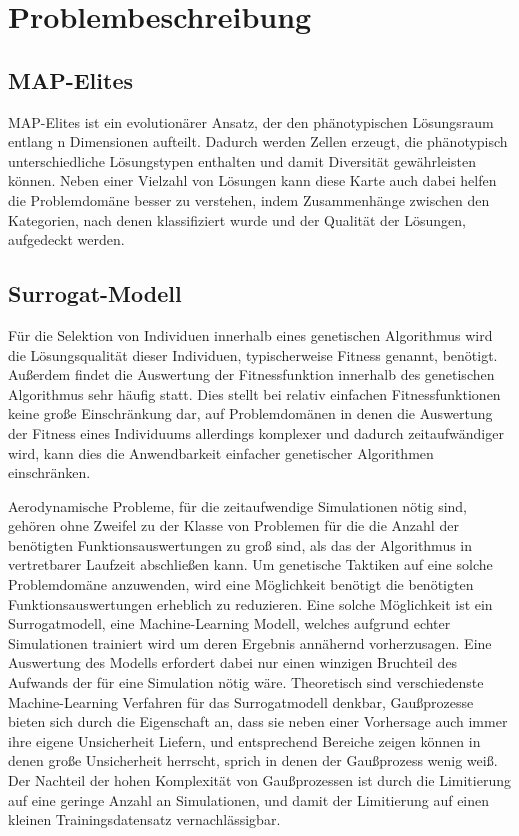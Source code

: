 \documentclass[12pt]{article}
\begin{document}
\section{Problembeschreibung}

\subsection{MAP-Elites}

MAP-Elites ist ein evolutionärer Ansatz, der den phänotypischen Lösungsraum entlang n Dimensionen aufteilt.
Dadurch werden Zellen erzeugt, die phänotypisch unterschiedliche Lösungstypen enthalten und damit Diversität gewährleisten können.
Neben einer Vielzahl von Lösungen kann diese Karte auch dabei helfen die Problemdomäne besser zu verstehen, indem Zusammenhänge zwischen den Kategorien, nach denen klassifiziert wurde und der Qualität der Lösungen, aufgedeckt werden.

\subsection{Surrogat-Modell}

Für die Selektion von Individuen innerhalb eines genetischen Algorithmus wird die Lösungsqualität dieser Individuen, typischerweise Fitness genannt, benötigt.
Außerdem findet die Auswertung der Fitnessfunktion innerhalb des genetischen Algorithmus sehr häufig statt.
Dies stellt bei relativ einfachen Fitnessfunktionen keine große Einschränkung dar, auf Problemdomänen in denen die Auswertung der Fitness eines Individuums allerdings komplexer und dadurch zeitaufwändiger wird, kann dies die Anwendbarkeit einfacher genetischer Algorithmen einschränken.

Aerodynamische Probleme, für die zeitaufwendige Simulationen nötig sind, gehören ohne Zweifel zu der Klasse von Problemen für die die Anzahl der benötigten Funktionsauswertungen zu groß sind, als das der Algorithmus in vertretbarer Laufzeit abschließen kann.
Um genetische Taktiken auf eine solche Problemdomäne anzuwenden, wird eine Möglichkeit benötigt die benötigten Funktionsauswertungen erheblich zu reduzieren.
Eine solche Möglichkeit ist ein Surrogatmodell, eine Machine-Learning Modell, welches aufgrund echter Simulationen trainiert wird um deren Ergebnis annähernd vorherzusagen.
Eine Auswertung des Modells erfordert dabei nur einen winzigen Bruchteil des Aufwands der für eine Simulation nötig wäre.
Theoretisch sind verschiedenste Machine-Learning Verfahren für das Surrogatmodell denkbar, Gaußprozesse bieten sich durch die Eigenschaft an, dass sie neben einer Vorhersage auch immer ihre eigene Unsicherheit Liefern, und entsprechend Bereiche zeigen können in denen große Unsicherheit herrscht, sprich in denen der Gaußprozess wenig weiß.
Der Nachteil der hohen Komplexität von Gaußprozessen  ist durch die Limitierung auf eine geringe Anzahl an Simulationen, und damit der Limitierung auf einen kleinen Trainingsdatensatz vernachlässigbar.
\end{document}
